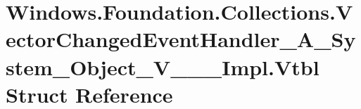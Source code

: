 \hypertarget{struct_windows_1_1_foundation_1_1_collections_1_1_vector_changed_event_handler___a___system___object___v_______impl_1_1_vtbl}{}\section{Windows.\+Foundation.\+Collections.\+Vector\+Changed\+Event\+Handler\+\_\+\+A\+\_\+\+System\+\_\+\+Object\+\_\+\+V\+\_\+\+\_\+\+\_\+\+Impl.\+Vtbl Struct Reference}
\label{struct_windows_1_1_foundation_1_1_collections_1_1_vector_changed_event_handler___a___system___object___v_______impl_1_1_vtbl}
